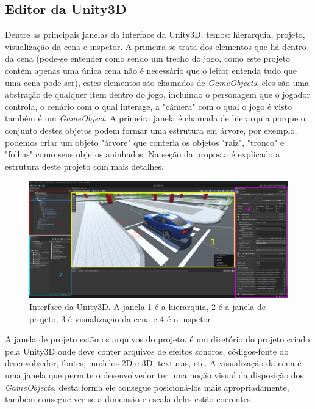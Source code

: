 \subsection{Editor da Unity3D}
Dentre as principais janelas da interface da Unity3D, temos: hierarquia, projeto, visualização da cena e inspetor. A primeira se trata dos elementos que há dentro da cena (pode-se entender como sendo um trecho do jogo, como este projeto contém apenas uma única cena não é necessário que o leitor entenda tudo que uma cena pode ser), estes elementos são chamados de \textit{GameObjects}, eles são uma abstração de qualquer item dentro do jogo, incluindo o personagem que o jogador controla, o cenário com o qual interage, a "câmera" com o qual o jogo é visto também é um \textit{GameObject}. A primeira janela é chamada de hierarquia porque o conjunto destes objetos podem formar uma estrutura em árvore, por exemplo, podemos criar um objeto "árvore" que conteria os objetos "raiz", "tronco" e "folhas" como seus objetos aninhados. Na seção da proposta é explicado a estrutura deste projeto com mais detalhes.

\begin{figure}[h]
   \centering
   \includegraphics[scale=0.2]{figs/interface-unity3d-indicadores.png}
    \caption{Interface da Unity3D. A janela 1 é a hierarquia, 2 é a janela de projeto, 3 é visualização da cena e 4 é o inspetor}
    \label{fig:unity-ui}
 \end{figure}

A janela de projeto estão os arquivos do projeto, é um diretório do projeto criado pela Unity3D onde deve conter arquivos de efeitos sonoros, códigos-fonte do desenvolvedor, fontes, modelos 2D e 3D, texturas, etc. A visualização da cena é uma janela que permite o desenvolvedor ter uma noção visual da disposição dos \textit{GameObjects}, desta forma ele consegue posicioná-los mais apropriadamente, também consegue ver se a dimensão e escala deles estão coerentes. 

